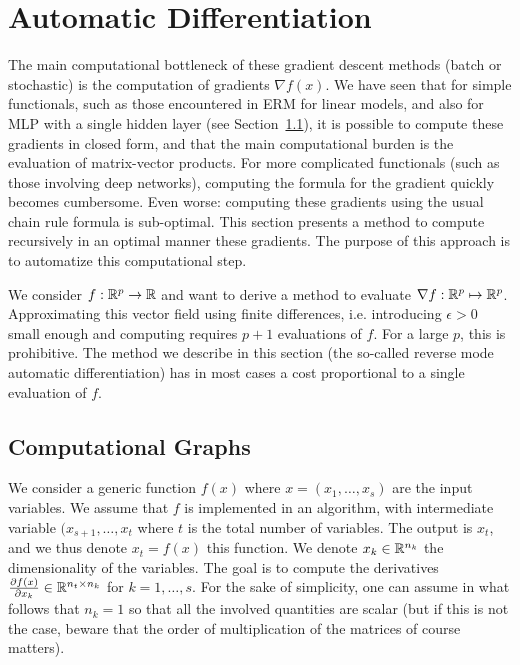 


\section{Automatic Differentiation}

The main computational bottleneck of these gradient descent methods (batch or stochastic) is the computation of gradients $\nabla f(x)$. We have seen that for simple functionals, such as those encountered in ERM for linear models, and also for MLP with a single hidden layer (see Section~\ref{}), it is possible to compute these gradients in closed form, and that the main computational burden is the evaluation of matrix-vector products. For more complicated functionals (such as those involving deep networks), computing the formula for the gradient quickly becomes cumbersome. Even worse: computing these gradients using the usual chain rule formula is sub-optimal. This section presents a method to compute recursively in an optimal manner these gradients. The purpose of this approach is to automatize this computational step.  

We consider $f : \mathbb{R}^p \rightarrow \mathbb{R}$ and want to derive a method to evaluate $\nabla f : \mathbb{R}^p \mapsto \mathbb{R}^p$. Approximating this vector field using finite differences, i.e. introducing $\epsilon>0$ small enough and computing 
requires $p+1$ evaluations of $f$. For a large $p$, this is prohibitive. The method we  describe in this section (the so-called reverse mode automatic differentiation) has in most cases a cost proportional to a single evaluation of $f$. 


\subsection{Computational Graphs}

We consider a generic function $f(x)$ where $x=(x_1,\ldots,x_s)$ are the input variables. We assume that $f$ is implemented in an algorithm, with intermediate variable $(x_{s+1},\ldots,x_t$ where $t$ is the total number of variables. The output is $x_t$, and we thus denote $x_t=f(x)$ this function. We denote $x_k \in \mathbb{R}^{n_k}$ the dimensionality of the variables. The goal is to compute the derivatives $\frac{ \partial f(x)}{\partial x_k} \in \mathbb{R}^{n_t \times n_k}$ for $k=1,\ldots,s$. For the sake of simplicity, one can assume in what follows that $n_k=1$ so that all the involved quantities are scalar (but if this is not the case, beware that the order of multiplication of the matrices of course matters).

